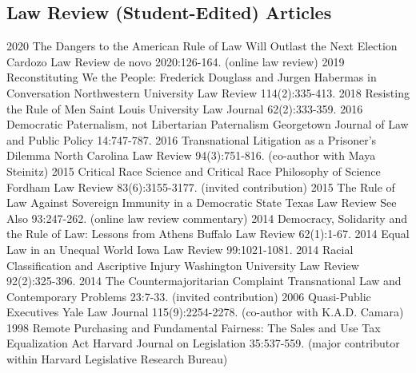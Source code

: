 \documentclass[letterpaper]{moderncv}
\begin{document}
\subsection{Law Review (Student-Edited) Articles}
\cventry
{2020}
{The Dangers to the American Rule of Law Will Outlast the Next Election}
{}
{Cardozo Law Review de novo}
{}
{2020:126-164. (online law review)}
\vspace{1mm}
\cventry
{2019}
{Reconstituting We the People: Frederick Douglass and Jurgen Habermas in Conversation}
{}
{Northwestern University Law Review}
{}
{114(2):335-413. }
\vspace{1mm}
\cventry
{2018}
{Resisting the Rule of Men}
{}
{Saint Louis University Law Journal}
{}
{62(2):333-359. }
\vspace{1mm}
\cventry
{2016}
{Democratic Paternalism, not Libertarian Paternalism}
{}
{Georgetown Journal of Law and Public Policy}
{}
{14:747-787. }
\vspace{1mm}
\cventry
{2016}
{Transnational Litigation as a Prisoner's Dilemma}
{}
{North Carolina Law Review}
{}
{94(3):751-816. (co-author with Maya Steinitz)}
\vspace{1mm}
\cventry
{2015}
{Critical Race Science and Critical Race Philosophy of Science}
{}
{Fordham Law Review}
{}
{83(6):3155-3177. (invited contribution)}
\vspace{1mm}
\cventry
{2015}
{The Rule of Law Against Sovereign Immunity in a Democratic State}
{}
{Texas Law Review See Also}
{}
{93:247-262. (online law review commentary)}
\vspace{1mm}
\cventry
{2014}
{Democracy, Solidarity and the Rule of Law: Lessons from Athens}
{}
{Buffalo Law Review}
{}
{62(1):1-67. }
\vspace{1mm}
\cventry
{2014}
{Equal Law in an Unequal World}
{}
{Iowa Law Review}
{}
{99:1021-1081. }
\vspace{1mm}
\cventry
{2014}
{Racial Classification and Ascriptive Injury}
{}
{Washington University Law Review}
{}
{92(2):325-396. }
\vspace{1mm}
\cventry
{2014}
{The Countermajoritarian Complaint}
{}
{Transnational Law and Contemporary Problems}
{}
{23:7-33. (invited contribution)}
\vspace{1mm}
\cventry
{2006}
{Quasi-Public Executives}
{}
{Yale Law Journal}
{}
{115(9):2254-2278. (co-author with K.A.D. Camara)}
\vspace{1mm}
\cventry
{1998}
{Remote Purchasing and Fundamental Fairness: The Sales and Use Tax Equalization Act}
{}
{Harvard Journal on Legislation}
{}
{35:537-559. (major contributor within Harvard Legislative Research Bureau)}
\vspace{1mm}
\vspace{1mm}
\end{document}
